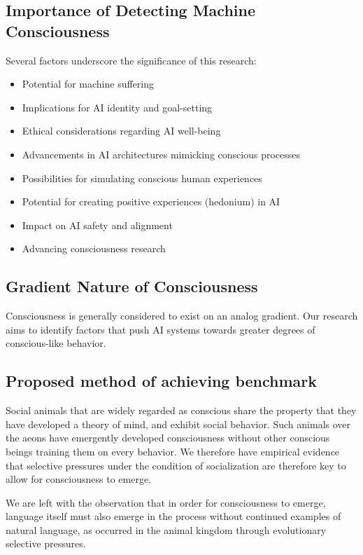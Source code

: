 \documentclass{article}
\begin{document}
\subsection{Importance of Detecting Machine Consciousness}
Several factors underscore the significance of this research:
\begin{itemize}
    \item Potential for machine suffering
    \item Implications for AI identity and goal-setting
    \item Ethical considerations regarding AI well-being
    \item Advancements in AI architectures mimicking conscious processes
    \item Possibilities for simulating conscious human experiences
    \item Potential for creating positive experiences (hedonium) in AI
    \item Impact on AI safety and alignment
    \item Advancing consciousness research
\end{itemize}

\subsection{Gradient Nature of Consciousness}
Consciousness is generally considered to exist on an analog gradient. Our research aims to identify factors that push AI systems towards greater degrees of conscious-like behavior.

\subsection{Proposed method of achieving benchmark}

Social animals that are widely regarded as conscious share the property that they have developed a theory of mind, and exhibit social behavior. Such animals over the aeons have emergently developed consciousness without other conscious beings training them on every behavior. We therefore have empirical evidence that selective pressures under the condition of socialization are therefore key to allow for consciousness to emerge.

We are left with the observation that in order for consciousness to emerge, language itself must also emerge in the process without continued examples of natural language, as occurred in the animal kingdom through evolutionary selective pressures.
\end{document}
